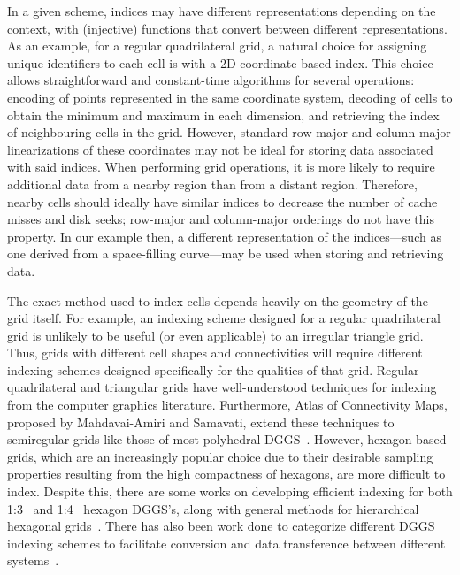 In a given scheme, indices may have different representations depending on the context, with (injective) functions that convert between different representations.
As an example, for a regular quadrilateral grid, a natural choice for assigning unique identifiers to each cell is with a 2D coordinate-based index.
This choice allows straightforward and constant-time algorithms for several operations: encoding of points represented in the same coordinate system, decoding of cells to obtain the minimum and maximum in each dimension, and retrieving the index of neighbouring cells in the grid.
However, standard row-major and column-major linearizations of these coordinates may not be ideal for storing data associated with said indices.
When performing grid operations, it is more likely to require additional data from a nearby region than from a distant region.
Therefore, nearby cells should ideally have similar indices to decrease the number of cache misses and disk seeks; row-major and column-major orderings do not have this property.
In our example then, a different representation of the indices---such as one derived from a space-filling curve---may be used when storing and retrieving data.


The exact method used to index cells depends heavily on the geometry of the grid itself.
For example, an indexing scheme designed for a regular quadrilateral grid is unlikely to be useful (or even applicable) to an irregular triangle grid.
Thus, grids with different cell shapes and connectivities will require different indexing schemes designed specifically for the qualities of that grid.
Regular quadrilateral and triangular grids have well-understood techniques for indexing from the computer graphics literature.
Furthermore, Atlas of Connectivity Maps, proposed by Mahdavai-Amiri and Samavati, extend these techniques to semiregular grids like those of most polyhedral DGGS~\cite{mahdavi2014atlas}.
However, hexagon based grids, which are an increasingly popular choice due to their desirable sampling properties resulting from the high compactness of hexagons, are more difficult to index.
Despite this, there are some works on developing efficient indexing for both 1:3~\cite{vince2006indexing} and 1:4~\cite{tong2013efficient} hexagon DGGS's, along with general methods for hierarchical hexagonal grids~\cite{mahdavi2015hexagonal}.
There has also been work done to categorize different DGGS indexing schemes to facilitate conversion and data transference between different systems~\cite{mahdavi2015categorization}.


